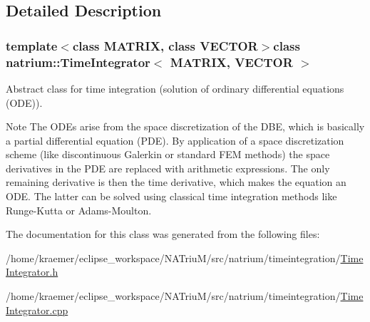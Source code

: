 \subsection{Detailed Description}
\subsubsection*{template$<$class M\-A\-T\-R\-I\-X, class V\-E\-C\-T\-O\-R$>$class natrium\-::\-Time\-Integrator$<$ M\-A\-T\-R\-I\-X, V\-E\-C\-T\-O\-R $>$}

Abstract class for time integration (solution of ordinary differential equations (O\-D\-E)). 

\begin{DoxyNote}{Note}
The O\-D\-Es arise from the space discretization of the D\-B\-E, which is basically a partial differential equation (P\-D\-E). By application of a space discretization scheme (like discontinuous Galerkin or standard F\-E\-M methods) the space derivatives in the P\-D\-E are replaced with arithmetic expressions. The only remaining derivative is then the time derivative, which makes the equation an O\-D\-E. The latter can be solved using classical time integration methods like Runge-\/\-Kutta or Adams-\/\-Moulton. 
\end{DoxyNote}


The documentation for this class was generated from the following files\-:\begin{DoxyCompactItemize}
\item 
/home/kraemer/eclipse\-\_\-workspace/\-N\-A\-Triu\-M/src/natrium/timeintegration/\hyperlink{TimeIntegrator_8h}{Time\-Integrator.\-h}\item 
/home/kraemer/eclipse\-\_\-workspace/\-N\-A\-Triu\-M/src/natrium/timeintegration/\hyperlink{TimeIntegrator_8cpp}{Time\-Integrator.\-cpp}\end{DoxyCompactItemize}
